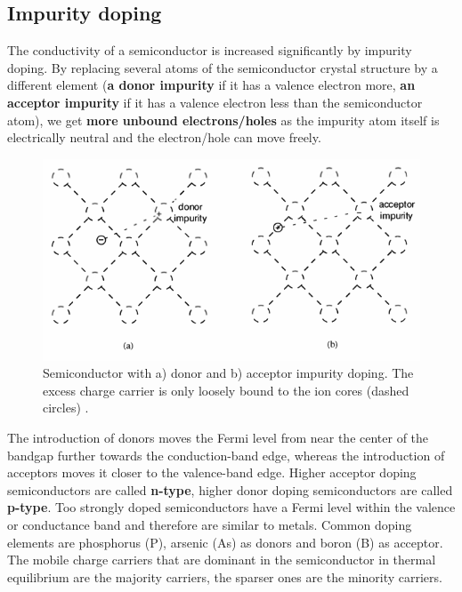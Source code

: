 \documentclass[main]{subfiles}
\begin{document}
\subsection{Impurity doping}

The conductivity of a semiconductor is increased significantly by impurity doping. By replacing several atoms of the semiconductor crystal structure by a different element (\textbf{a donor impurity} if it has a valence electron more, \textbf{an acceptor impurity} if it has a valence electron less than the semiconductor atom), we get \textbf{more unbound electrons/holes} as the impurity atom itself is electrically neutral and the electron/hole can move freely.

\begin{figure}[H]
\centering
\includegraphics[scale=0.4]{figs/impurity_doping.png}
\caption{Semiconductor with a) donor and b) acceptor impurity doping. The excess charge carrier is only loosely bound to the ion cores (dashed circles) \cite{book:VLSI}.}
\end{figure}

The introduction of donors moves the Fermi level from near the center of the bandgap further towards the conduction-band edge, whereas the
introduction of acceptors moves it closer to the valence-band edge. Higher acceptor doping semiconductors are called \textbf{n-type}, higher donor doping semiconductors are called \textbf{p-type}. Too strongly doped semiconductors have a Fermi level within the valence or conductance band and therefore are similar to metals. Common doping elements are phosphorus (P), arsenic (As) as donors and boron (B) as acceptor.\\
The mobile charge carriers that are dominant in the semiconductor in thermal equilibrium are the majority carriers, the sparser ones are the minority carriers.
\end{document}
